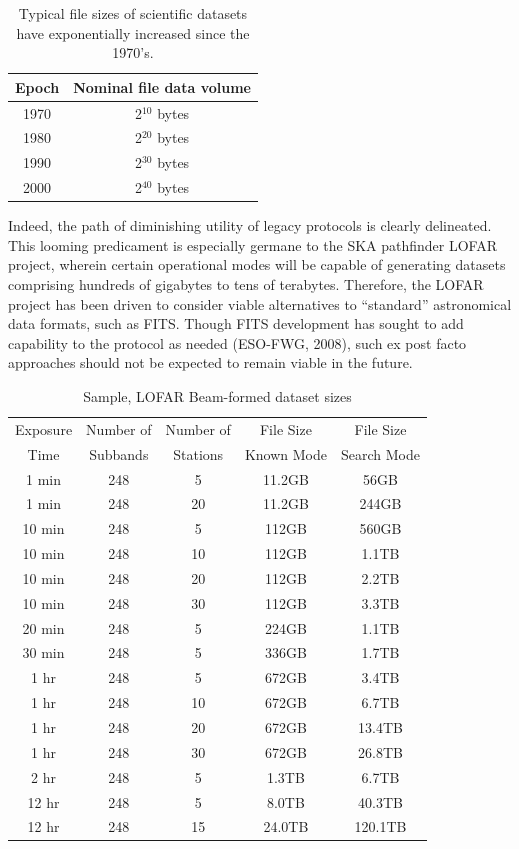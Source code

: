 \documentclass{PoS}
\begin{document}
\begin{table}[h]
  \centering
  \begin{tabular}{|cc|}
    \hline
    \sc Epoch & \sc Nominal file data volume\\ 
\hline \hline
 1970  &  2$^{10}$ bytes\\
 1980  &  2$^{20}$ bytes\\
 1990  &  2$^{30}$ bytes\\
 2000  &  2$^{40}$ bytes\\
\hline
\end{tabular}
\caption{Typical file sizes of scientific datasets have exponentially increased
since the 1970's.}
\end{table} 

Indeed, the path of diminishing utility of legacy protocols is clearly delineated.  This looming predicament is especially germane to the SKA pathfinder LOFAR project, wherein certain operational modes will be capable of generating datasets comprising hundreds of gigabytes to tens of terabytes.  Therefore, the LOFAR project has been driven to consider viable alternatives to ``standard'' astronomical data formats, such as FITS.  Though FITS development has sought to add capability to the protocol as needed (ESO-FWG, 2008), such ex post facto approaches should not be expected to remain viable in the future.

\begin{table}[hbt]
  \centering
  \begin{tabular}{|ccccc|}
    \hline
    \sc Exposure & \sc Number of & \sc Number of & \sc File Size  & \sc File Size  \\
    \sc Time     & \sc Subbands  & \sc Stations  & \sc Known Mode & \sc Search Mode \\
    \hline \hline
     1 min & 248 & 5 & 11.2GB & 56GB \\
     1 min & 248 & 20 & 11.2GB & 244GB \\
\hline
     10 min & 248 & 5  & 112GB & 560GB \\
     10 min & 248 & 10 & 112GB & 1.1TB \\
     10 min & 248 & 20 & 112GB & 2.2TB \\
     10 min & 248 & 30 & 112GB & 3.3TB \\
\hline
     20 min & 248 & 5 & 224GB & 1.1TB \\
\hline
     30 min & 248 & 5 & 336GB & 1.7TB \\
\hline
     1 hr  & 248 & 5  & 672GB & 3.4TB \\
     1 hr  & 248 & 10 & 672GB & 6.7TB \\
     1 hr  & 248 & 20 & 672GB & 13.4TB\\
     1 hr  & 248 & 30 & 672GB & 26.8TB \\
\hline
     2 hr  & 248 & 5 & 1.3TB & 6.7TB \\
\hline
     12 hr & 248 & 5 & 8.0TB & 40.3TB \\
     12 hr & 248 & 15 & 24.0TB & 120.1TB \\
    \hline
 \end{tabular}
  \caption{Sample, LOFAR Beam-formed dataset sizes}
  \label{tab:data size}
\end{table}
\end{document}

